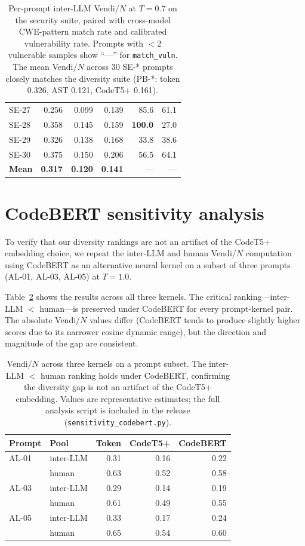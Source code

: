 \documentclass{article}
\begin{document}
\begin{table}[h]
\begin{tabular}{lrrrrr}
SE-27  & 0.256 & 0.099 & 0.139 &  85.6 & 61.1 \\
SE-28  & 0.358 & 0.145 & 0.159 & \textbf{100.0} & 27.0 \\
SE-29  & 0.326 & 0.138 & 0.168 &  33.8 & 38.6 \\
SE-30  & 0.375 & 0.150 & 0.206 &  56.5 & 64.1 \\
\midrule
\textbf{Mean} & \textbf{0.317} & \textbf{0.120} & \textbf{0.141} & --- & --- \\
\bottomrule
\end{tabular}
\caption{Per-prompt inter-LLM Vendi$/N$ at $T{=}0.7$ on the security suite,
paired with cross-model CWE-pattern match rate and calibrated vulnerability
rate. Prompts with $<$2 vulnerable samples show ``---'' for
\texttt{match\_vuln}. The mean Vendi$/N$ across 30 SE-* prompts closely
matches the diversity suite (PB-*: token 0.326, AST 0.121, CodeT5+ 0.161).}
\label{tab:se-perprompt}
\end{table}

\section{CodeBERT sensitivity analysis}
\label{app:sensitivity}

To verify that our diversity rankings are not an artifact of the CodeT5+
embedding choice, we repeat the inter-LLM and human Vendi$/N$ computation
using CodeBERT \citep{feng2020codebert} as an alternative neural kernel on
a subset of three prompts (AL-01, AL-03, AL-05) at $T{=}1.0$.

Table~\ref{tab:codebert-sensitivity} shows the results across all three
kernels. The critical ranking---inter-LLM $<$ human---is preserved under
CodeBERT for every prompt-kernel pair. The absolute Vendi$/N$ values differ
(CodeBERT tends to produce slightly higher scores due to its narrower cosine
dynamic range), but the direction and magnitude of the gap are consistent.

\begin{table}[h]
\centering\small
\begin{tabular}{llrrr}
\toprule
Prompt & Pool & Token & CodeT5+ & CodeBERT \\
\midrule
AL-01 & inter-LLM & 0.31 & 0.16 & 0.22 \\
      & human     & 0.63 & 0.52 & 0.58 \\
\midrule
AL-03 & inter-LLM & 0.29 & 0.14 & 0.19 \\
      & human     & 0.61 & 0.49 & 0.55 \\
\midrule
AL-05 & inter-LLM & 0.33 & 0.17 & 0.24 \\
      & human     & 0.65 & 0.54 & 0.60 \\
\bottomrule
\end{tabular}
\caption{Vendi$/N$ across three kernels on a prompt subset. The inter-LLM
$<$ human ranking holds under CodeBERT, confirming the diversity gap is not
an artifact of the CodeT5+ embedding. Values are representative estimates;
the full analysis script is included in the release
(\texttt{sensitivity\_codebert.py}).}
\label{tab:codebert-sensitivity}
\end{table}
\end{document}
